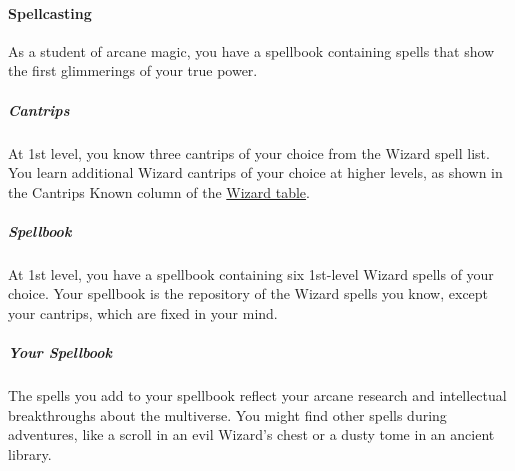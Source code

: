 \paragraph{Spellcasting}\label{wizard-feature-spellcasting}

As a student of arcane magic, you have a spellbook containing spells
that show the first glimmerings of your true power.

\subparagraph{Cantrips}\label{_cantrips_2}

At 1st level, you know three cantrips of your choice from the Wizard
spell list. You learn additional Wizard cantrips of your choice at
higher levels, as shown in the Cantrips Known column of the
\hyperref[wizard-table]{Wizard table}.

\subparagraph{Spellbook}\label{_spellbook}

At 1st level, you have a spellbook containing six 1st-level Wizard
spells of your choice. Your spellbook is the repository of the Wizard
spells you know, except your cantrips, which are fixed in your mind.

\subparagraph{Your Spellbook}\label{_your_spellbook}

The spells you add to your spellbook reflect your arcane research and
intellectual breakthroughs about the multiverse. You might find other
spells during adventures, like a scroll in an evil Wizard's chest or a
dusty tome in an ancient library.

